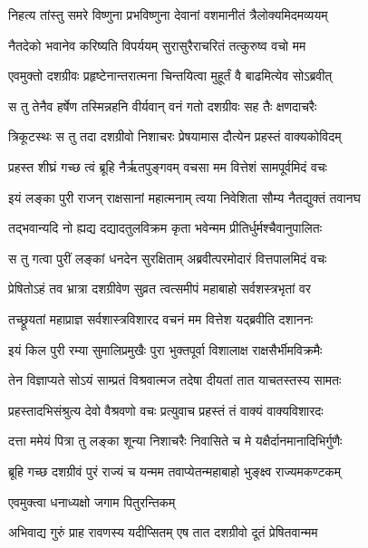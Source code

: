 \twolineshloka
{निहत्य तांस्तु समरे विष्णुना प्रभविष्णुना}
{देवानां वशमानीतं त्रैलोक्यमिदमव्ययम्} %

\twolineshloka
{नैतदेको भवानेव करिष्यति विपर्ययम्}
{सुरासुरैराचरितं तत्कुरुष्व वचो मम} %

\twolineshloka
{एवमुक्तो दशग्रीवः प्रहृष्टेनान्तरात्मना}
{चिन्तयित्वा मुहूर्तं वै बाढमित्येव सोऽब्रवीत्} %

\twolineshloka
{स तु तेनैव हर्षेण तस्मिन्नहनि वीर्यवान्}
{वनं गतो दशग्रीवः सह तैः क्षणदाचरैः} %

\twolineshloka
{त्रिकूटस्थः स तु तदा दशग्रीवो निशाचरः}
{प्रेषयामास दौत्येन प्रहस्तं वाक्यकोविदम्} %

\twolineshloka
{प्रहस्त शीघ्रं गच्छ त्वं ब्रूहि नैर्ऋतपुङ्गवम्}
{वचसा मम वित्तेशं सामपूर्वमिदं वचः} %

\twolineshloka
{इयं लङ्का पुरी राजन् राक्षसानां महात्मनाम्}
{त्वया निवेशिता सौम्य नैतद्युक्तं तवानघ} %

\twolineshloka
{तद्भवान्यदि नो ह्यद्य दद्यादतुलविक्रम}
{कृता भवेन्मम प्रीतिर्धुर्मश्चैवानुपालितः} %

\twolineshloka
{स तु गत्वा पुरीं लङ्कां धनदेन सुरक्षिताम्}
{अब्रवीत्परमोदारं वित्तपालमिदं वचः} %

\twolineshloka
{प्रेषितोऽहं तव भ्रात्रा दशग्रीवेण सुव्रत}
{त्वत्समीपं महाबाहो सर्वशस्त्रभृतां वर} %

\twolineshloka
{तच्छ्रूयतां महाप्राज्ञ सर्वशास्त्रविशारद}
{वचनं मम वित्तेश यद्ब्रवीति दशाननः} %

\twolineshloka
{इयं किल पुरी रम्या सुमालिप्रमुखैः पुरा}
{भुक्तपूर्वा विशालाक्ष राक्षसैर्भीमविक्रमैः} %

\twolineshloka
{तेन विज्ञाप्यते सोऽयं साम्प्रतं विश्रवात्मज}
{तदेषा दीयतां तात याचतस्तस्य सामतः} %

\twolineshloka
{प्रहस्तादभिसंश्रुत्य देवो वैश्रवणो वचः}
{प्रत्युवाच प्रहस्तं तं वाक्यं वाक्यविशारदः} %

\twolineshloka
{दत्ता ममेयं पित्रा तु लङ्का शून्या निशाचरैः}
{निवासिते च मे यक्षैर्दानमानादिभिर्गुणैः} %

\twolineshloka
{ब्रूहि गच्छ दशग्रीवं पुरं राज्यं च यन्मम}
{तवाप्येतन्महाबाहो भुङ्क्ष्व राज्यमकण्टकम्} %

\onelineshloka
{एवमुक्त्वा धनाध्यक्षो जगाम पितुरन्तिकम्} %

\twolineshloka
{अभिवाद्य गुरुं प्राह रावणस्य यदीप्सितम्}
{एष तात दशग्रीवो दूतं प्रेषितवान्मम} %

